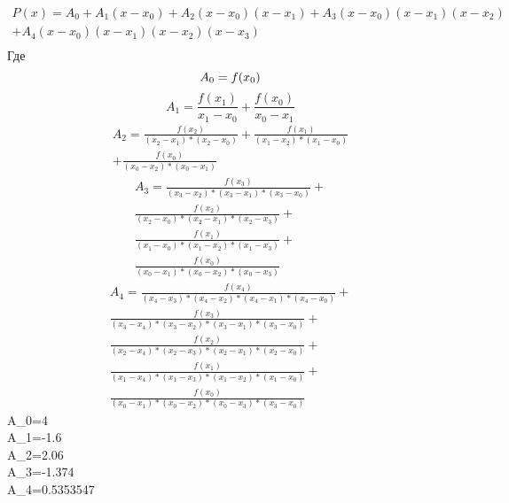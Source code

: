 \documentclass[russian,utf8,nocolumnxxxi,nocolumnxxxii]{eskdtext}
\begin{document}
\begin{equation}
  \begin{split}
    P(x)=A_0+A_1(x-x_0)+A_2(x-x_0)(x-x_1)+A_3(x-x_0)(x-x_1)(x-x_2) \\
    +A_4(x-x_0)(x-x_1)(x-x_2)(x-x_3)\\
  \end{split}
\end{equation}
Где
\begin{equation}
A_0=f(x_0)\\
\end{equation}
\begin{equation}
A_1=\frac{f(x_1)}{x_1-x_0}+\frac{f(x_0)}{x_0-x_1}
\end{equation}
\begin{equation}
\begin{split}
A_2=\frac{f(x_2)}{(x_2-x_1)*(x_2-x_0)}+\frac{f(x_1)}{(x_1-x_2)*(x_1-x_0)}\\
+\frac{f(x_0)}{(x_0-x_2)*(x_0-x_1)}
\end{split}
\end{equation}
\begin{equation}
\begin{split}
A_3=\frac{f(x_3)}{(x_3-x_2)*(x_3-x_1)*(x_3-x_0)}+\\
\frac{f(x_2)}{(x_2-x_0)*(x_2-x_1)*(x_2-x_3)}+\\
\frac{f(x_1)}{(x_1-x_0)*(x_1-x_2)*(x_1-x_3)}+\\
\frac{f(x_0)}{(x_0-x_1)*(x_0-x_2)*(x_0-x_3)}
\end{split}
\end{equation}
\begin{equation}
\begin{split}
A_4=\frac{f(x_4)}{(x_4-x_3)*(x_4-x_2)*(x_4-x_1)*(x_4-x_0)}+\\
\frac{f(x_3)}{(x_3-x_4)*(x_3-x_2)*(x_3-x_1)*(x_3-x_0)}+\\
\frac{f(x_2)}{(x_2-x_4)*(x_2-x_3)*(x_2-x_1)*(x_2-x_0)}+\\
\frac{f(x_1)}{(x_1-x_4)*(x_1-x_3)*(x_1-x_2)*(x_1-x_0)}+\\
\frac{f(x_0)}{(x_0-x_1)*(x_0-x_2)*(x_0-x_3)*(x_3-x_0)}
\end{split}
\end{equation}
A_0=4\\
A_1=-1.6\\
A_2=2.06\\
A_3=-1.374\\
A_4=0.5353547\\
\end{document}
